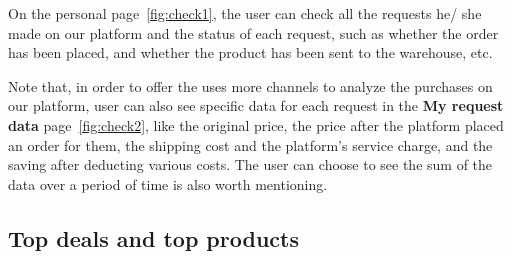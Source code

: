 On the personal page~\ref{fig:check1}, the user can check all the requests he/ she made on our platform and the status of each request, such as whether the order has been placed, and whether the product has been sent to the warehouse, etc.

Note that, in order to offer the uses more channels to analyze the purchases on our platform, user can also see specific data for each request in the \textbf{My request data} page~\ref{fig:check2}, like the original price, the price after the platform placed an order for them, the shipping cost and the platform's service charge, and the saving after deducting various costs. The user can choose to see the sum of the data over a period of time is also worth mentioning.

\subsection{Top deals and top products}

